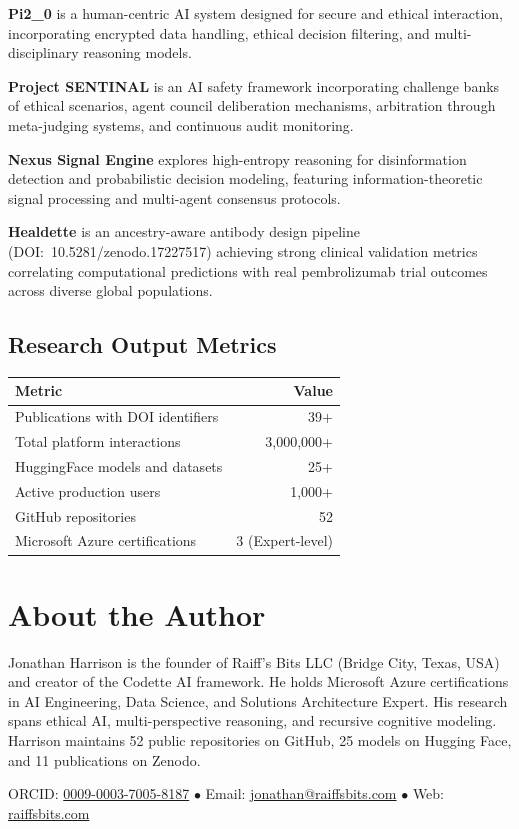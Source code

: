 \documentclass[11pt,a4paper]{article}
\begin{document}
\textbf{Pi2\_0} is a human-centric AI system designed for secure and ethical interaction, incorporating encrypted data handling, ethical decision filtering, and multi-disciplinary reasoning models.

\textbf{Project SENTINAL} is an AI safety framework incorporating challenge banks of ethical scenarios, agent council deliberation mechanisms, arbitration through meta-judging systems, and continuous audit monitoring.

\textbf{Nexus Signal Engine} explores high-entropy reasoning for disinformation detection and probabilistic decision modeling, featuring information-theoretic signal processing and multi-agent consensus protocols.

\textbf{Healdette} is an ancestry-aware antibody design pipeline (DOI:~10.5281/zenodo.17227517) achieving strong clinical validation metrics correlating computational predictions with real pembrolizumab trial outcomes across diverse global populations.

\subsection{Research Output Metrics}
\begin{table}[H]
\centering
\begin{tabular}{@{}lr@{}}
\toprule
\textbf{Metric} & \textbf{Value} \\
\midrule
Publications with DOI identifiers & 39+ \\
Total platform interactions       & 3,000,000+ \\
HuggingFace models and datasets   & 25+ \\
Active production users            & 1,000+ \\
GitHub repositories                & 52 \\
Microsoft Azure certifications     & 3 (Expert-level) \\
\bottomrule
\end{tabular}
\end{table}

\section*{About the Author}
Jonathan Harrison is the founder of Raiff's Bits LLC (Bridge City, Texas, USA) and creator of the Codette AI framework. He holds Microsoft Azure certifications in AI Engineering, Data Science, and Solutions Architecture Expert. His research spans ethical AI, multi-perspective reasoning, and recursive cognitive modeling. Harrison maintains 52 public repositories on GitHub, 25 models on Hugging Face, and 11 publications on Zenodo.

\medskip
\noindent ORCID: \href{https://orcid.org/0009-0003-7005-8187}{0009-0003-7005-8187} \quad $\bullet$ \quad Email: \href{mailto:jonathan@raiffsbits.com}{jonathan@raiffsbits.com} \quad $\bullet$ \quad Web: \href{https://raiffsbits.com}{raiffsbits.com}
\end{document}
